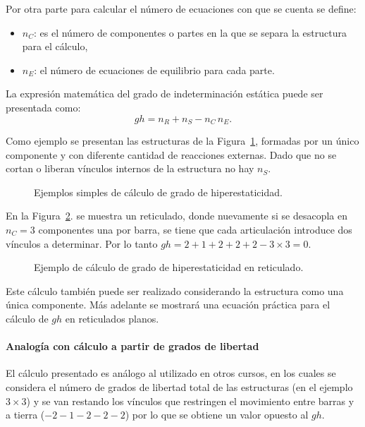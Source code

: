 Por otra parte para calcular el número de ecuaciones con que se cuenta se define:
%
\begin{itemize}
	\item $n_C$: es el número de componentes o partes en la que se separa la estructura para el cálculo,
	\item $n_E$: el número de ecuaciones de equilibrio para cada parte.
	\end{itemize}

La expresión matemática del grado de indeterminación estática puede ser presentada como:
%
\begin{equation} \label{eqn:gradoh}
gh = n_R + n_S - n_C \, n_{E}.
\end{equation}

Como ejemplo se presentan las estructuras de la Figura~\ref{fig:ejemghSimp}, formadas por un único componente y con diferente cantidad de reacciones externas. Dado que no se cortan o liberan vínculos internos de la estructura no hay $n_S$.

\begin{figure}[htb]
\centering
 \def\svgwidth{0.95\textwidth}
  
  \caption{Ejemplos simples de cálculo de grado de hiperestaticidad.}
  \label{fig:ejemghSimp}
\end{figure}

En la Figura~\ref{fig:ejemghMed}. se muestra un reticulado, donde nuevamente si se desacopla en $n_C=3$ componentes una por barra, se tiene que cada articulación introduce dos vínculos a determinar. Por lo tanto $gh = 2+1+2+2+2-3\times 3 = 0$.

\begin{figure}[htb]
	\centering
	\def\svgwidth{0.6\textwidth}
	
	\caption{Ejemplo de cálculo de grado de hiperestaticidad en reticulado.}
	\label{fig:ejemghMed}
\end{figure}

Este cálculo también puede ser realizado considerando la estructura como una única componente. Más adelante se mostrará una ecuación práctica para el cálculo de $gh$ en reticulados planos.

\paragraph{Analogía con cálculo a partir de grados de libertad} %
El cálculo presentado es análogo al utilizado en otros cursos, en los cuales se considera el número de grados de libertad total de las estructuras (en el ejemplo $3\times 3$) y se van restando los vínculos que restringen el movimiento entre barras y a tierra ($-2-1-2-2-2$) por lo que se obtiene un valor opuesto al $gh$.

